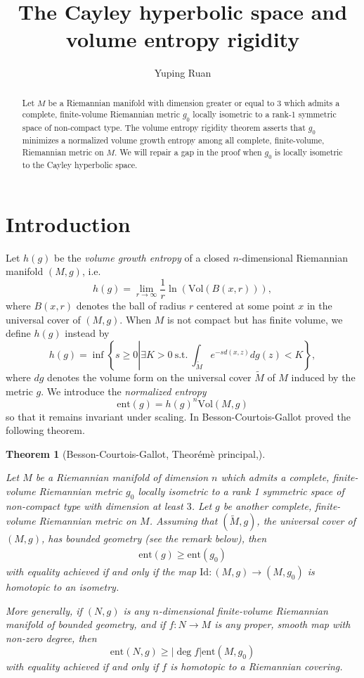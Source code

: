 \documentclass{article}
\title{The Cayley hyperbolic space and volume entropy rigidity}
\author{Yuping Ruan}
\date{}
\newcommand{\vol}{\mathrm{Vol}}
\newcommand{\id}{\mathrm{Id}}
\newtheorem{thm}{Theorem}[section]
\theoremstyle{definition}
\begin{document}
\maketitle
\begin{abstract}
Let $M$ be a Riemannian manifold with dimension greater or equal to $3$ which admits a complete, finite-volume Riemannian metric $g_0$ locally isometric to a rank-1 symmetric space of non-compact type. The volume entropy rigidity theorem \cite[Theor\'em\`e principal]{BCG1} asserts that $g_0$ minimizes a normalized volume growth entropy among all complete, finite-volume, Riemannian metric on $M$. We will repair a gap in the proof when $g_0$ is locally isometric to the Cayley hyperbolic space.
\end{abstract}
\tableofcontents
\section{Introduction}\label{s0}
Let $h(g)$ be the \emph{volume growth entropy} of a closed $n$-dimensional Riemannian manifold $(M,g)$, i.e.
$$h(g)=\lim_{r\to \infty}\frac{1}{r}\ln(\vol (B(x,r))),$$
where $B(x,r)$ denotes the ball of radius $r$ centered at some point $x$ in the universal cover of $(M,g)$. When $M$ is not compact but has finite volume, we define $h(g)$ instead by
$$h(g)=\inf\left\{ s\geq 0\left|\exists K>0\mathrm{~s.t.~}\int_{\widetilde M}e^{-s d(x,z)}dg(z)<K\right.\right\},$$ 
where $dg$ denotes the volume form on the universal cover $\widetilde M$ of $M$ induced by the metric $g$. We introduce the \emph{normalized entropy} 
$$\mathrm{ent}(g)=h(g)^n\vol(M,g)$$
so that it remains invariant under scaling. In \cite{BCG1} Besson-Courtois-Gallot proved the following theorem.
\begin{thm}[Besson-Courtois-Gallot, Theor\'em\`e principal,\cite{BCG1}]\label{main_thm}

Let $M$ be a Riemannian manifold of dimension $n$ which admits a complete, finite-volume Riemannian metric $g_0$ locally isometric to a rank 1 symmetric space of non-compact type with dimension at least $3$. Let $g$ be another complete, finite-volume Riemannian metric on $M$. Assuming that $(\widetilde M,g)$, the universal cover of $(M,g)$, has bounded geometry (see the remark below), then
\begin{align}\label{ent_rigid_ineq}
\mathrm{ent}(g)\geq\mathrm{ent}(g_0)
\end{align}
with equality achieved if and only if the map $\id:(M,g)\to (M,g_0)$ is homotopic to an isometry.

More generally, if $(N,g)$ is any $n$-dimensional finite-volume Riemannian manifold of bounded geometry, and if $f:N\to M$ is any proper, smooth map with non-zero degree, then
$$\mathrm{ent}(N,g)\geq|\deg f|\mathrm{ent}(M,g_0)$$
with equality achieved if and only if $f$ is homotopic to a Riemannian covering.
\end{thm}
\end{document}
